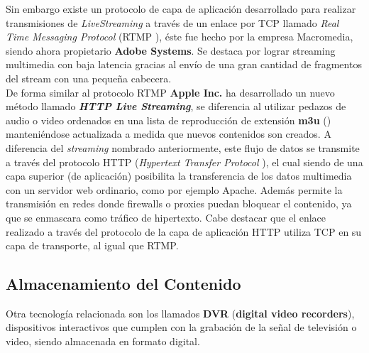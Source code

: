 Sin embargo existe un protocolo de capa de aplicación desarrollado para realizar transmisiones de \textit{LiveStreaming} a través de un enlace por TCP llamado \textit{Real Time Messaging Protocol} (RTMP \cite{bib:rtmp-specs}), éste fue hecho por la empresa Macromedia, siendo ahora propietario \textbf{Adobe Systems}. Se destaca por lograr streaming multimedia con baja latencia gracias al envío de una gran cantidad de fragmentos del stream con una pequeña cabecera. \\

	
	De forma similar al protocolo RTMP \textbf{Apple Inc.} ha desarrollado un nuevo método llamado \textit{\textbf{HTTP Live Streaming}}, se diferencia al utilizar pedazos de audio o video  ordenados en una lista de reproducción de extensión \textbf{m3u} (\cite{sota:m3u-specs}) manteniéndose actualizada a medida que nuevos contenidos son creados. A diferencia del \textit{streaming} nombrado anteriormente, este flujo de datos se transmite a través del protocolo HTTP (\textit{Hypertext Transfer Protocol} \cite{sota:rfc-http}), el cual siendo de una capa superior (de aplicación) posibilita la transferencia de los datos multimedia con un servidor web ordinario, como por ejemplo Apache. Además permite la transmisión en redes donde firewalls o proxies puedan bloquear el contenido, ya que se enmascara como tráfico de hipertexto. Cabe destacar que el enlace realizado a través del protocolo de la capa de aplicación HTTP utiliza TCP en su capa de transporte, al igual que RTMP.


\subsection{Almacenamiento del Contenido}

Otra tecnología relacionada son los llamados \textbf{DVR} (\textbf{digital video recorders}), dispositivos interactivos que cumplen con la grabación de la señal de televisión o video, siendo almacenada en formato digital.\\

